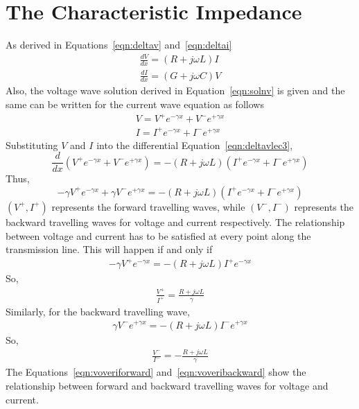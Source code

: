 \section{The Characteristic Impedance}
As derived in Equations~\eqref{eqn:deltav} and~\eqref{eqn:deltai}
\begin{align}
\frac{dV}{dx} = (R+j\omega L)I\label{eqn:deltavlec3}\\
\frac{dI}{dx} = (G+j\omega C)V\label{en:deltavlec3}
\end{align}
Also, the voltage wave solution derived in Equation~\eqref{eqn:solnv} is given and the same can be written for the current wave equation as follows
\begin{align*}
V = V^+e^{-\gamma x}+V^-e^{+\gamma x}\\
I = I^+e^{-\gamma x}+I^-e^{+\gamma x}
\end{align*}
Substituting $V$ and $I$ into the differential Equation~\eqref{eqn:deltavlec3},
\[
\frac{d}{dx}(V^+e^{-\gamma x}+V^-e^{+\gamma x}) = -(R+j\omega L)(I^+e^{-\gamma x}+I^-e^{+\gamma x})
\]
Thus,
\[
-\gamma V^+e^{-\gamma x}+\gamma V^-e^{+\gamma x} = -(R+j\omega L)(I^+e^{-\gamma x}+I^-e^{+\gamma x})
\]
$(V^+, I^+)$ represents the forward travelling waves, while $(V^-, I^-)$ represents the backward travelling waves for voltage and current respectively. The relationship between voltage and current has to be satisfied at every point along the transmission line. This will happen if and only if
\begin{align*}
-\gamma V^+e^{-\gamma x} = -(R+j\omega L)I^+e^{-\gamma x}
\end{align*}
So,
\begin{align}
\frac{V^+}{I^+} = \frac{R+j\omega L}{\gamma}
\label{eqn:voveriforward}
\end{align}
Similarly, for the backward travelling wave, 
\begin{align*}
\gamma V^-e^{+\gamma x} = -(R+j\omega L)I^-e^{+\gamma x}
\end{align*}
So,
\begin{align}
\frac{V^-}{I^-} = -\frac{R+j\omega L}{\gamma}
\label{eqn:voveribackward}
\end{align}
The Equations~\eqref{eqn:voveriforward} and~\eqref{eqn:voveribackward} show the relationship between forward and backward travelling waves for voltage and current.

